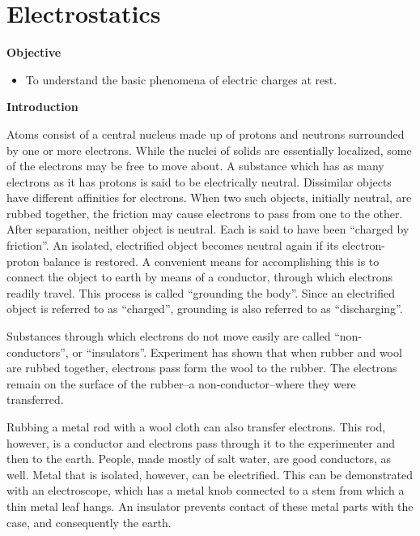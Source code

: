 
\section{Electrostatics}

\makelabheader %

\textbf{Objective}

\begin{itemize}
\item To understand the basic phenomena of electric charges at rest.
\end{itemize}
\textbf{Introduction}

Atoms consist of a central nucleus made up of protons and neutrons
surrounded by one or more electrons. While the nuclei of solids are
essentially localized, some of the electrons may be free to move about.
A substance which has as many electrons as it has protons is said
to be electrically neutral. Dissimilar objects have different affinities
for electrons. When two such objects, initially neutral, are rubbed
together, the friction may cause electrons to pass from one to the
other. After separation, neither object is neutral. Each is said to
have been {}``charged by friction''. An isolated, electrified object
becomes neutral again if its electron-proton balance is restored.
A convenient means for accomplishing this is to connect the object
to earth by means of a conductor, through which electrons readily
travel. This process is called {}``grounding the body''. Since an
electrified object is referred to as {}``charged'', grounding is
also referred to as {}``discharging''.

Substances through which electrons do not move easily are called {}``non-conductors'',
or {}``insulators''. Experiment has shown that when rubber and wool
are rubbed together, electrons pass form the wool to the rubber. The
electrons remain on the surface of the rubber--a non-conductor--where
they were transferred.

Rubbing a metal rod with a wool cloth can also transfer electrons.
This rod, however, is a conductor and electrons pass through it to
the experimenter and then to the earth. People, made mostly of salt
water, are good conductors, as well. Metal that is isolated, however,
can be electrified. This can be demonstrated with an electroscope,
which has a metal knob connected to a stem from which a thin metal
leaf hangs. An insulator prevents contact of these metal parts with
the case, and consequently the earth.

